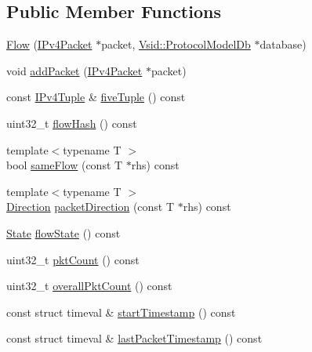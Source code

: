 \subsection*{Public Member Functions}
\begin{DoxyCompactItemize}
\item 
\hyperlink{class_vsid_common_1_1_flow_a88a60ef6857c0b4dbcec4cc62828be6d}{Flow} (\hyperlink{class_vsid_common_1_1_i_pv4_packet}{I\-Pv4\-Packet} $\ast$packet, \hyperlink{class_vsid_1_1_protocol_model_db}{Vsid\-::\-Protocol\-Model\-Db} $\ast$database)
\item 
void \hyperlink{class_vsid_common_1_1_flow_a314bc25fad15a7a2b052dfda75cc3af6}{add\-Packet} (\hyperlink{class_vsid_common_1_1_i_pv4_packet}{I\-Pv4\-Packet} $\ast$packet)
\item 
const \hyperlink{class_vsid_common_1_1_i_pv4_tuple}{I\-Pv4\-Tuple} \& \hyperlink{class_vsid_common_1_1_flow_a832be3ee7521fdbba1072da2f0106fdf}{five\-Tuple} () const 
\item 
uint32\-\_\-t \hyperlink{class_vsid_common_1_1_flow_a25be552976420023b17052ee3b4d5bf6}{flow\-Hash} () const 
\item 
{\footnotesize template$<$typename T $>$ }\\bool \hyperlink{class_vsid_common_1_1_flow_a85284a063d691f0c54453695255fe6db}{same\-Flow} (const T $\ast$rhs) const 
\item 
{\footnotesize template$<$typename T $>$ }\\\hyperlink{class_vsid_common_1_1_flow_a82b0cd313a915325b97133fd8e104781}{Direction} \hyperlink{class_vsid_common_1_1_flow_a8708e13cea69ad630274901ec94b5cf4}{packet\-Direction} (const T $\ast$rhs) const 
\item 
\hyperlink{class_vsid_common_1_1_flow_a4c78d7517903031a861c7287e706a6c2}{State} \hyperlink{class_vsid_common_1_1_flow_ac9ab4527fdac8cef6b1680b5c9e62015}{flow\-State} () const 
\item 
uint32\-\_\-t \hyperlink{class_vsid_common_1_1_flow_a41a3ebb168028d3cf0ea96b7e438ca89}{pkt\-Count} () const 
\item 
uint32\-\_\-t \hyperlink{class_vsid_common_1_1_flow_ab1640288592343532073bf506fc8a23e}{overall\-Pkt\-Count} () const 
\item 
const struct timeval \& \hyperlink{class_vsid_common_1_1_flow_a79a18af1103ad0571cbc4d7f27522274}{start\-Timestamp} () const 
\item 
const struct timeval \& \hyperlink{class_vsid_common_1_1_flow_af2613297a470084ea8c4731d42126389}{last\-Packet\-Timestamp} () const 

\end{DoxyCompactItemize}
